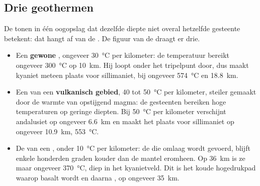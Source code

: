 \subsection{Drie geothermen}

De  tonen in één oogopslag dat dezelfde diepte niet overal hetzelfde
gesteente betekent: dat hangt af van de . De figuur van de 
draagt er drie.

\begin{itemize}
  \item Een \textbf{gewone} , ongeveer \qty{30}{\celsius} per
        kilometer: de temperatuur bereikt ongeveer \qty{300}{\celsius} op
        \qty{10}{km}. Hij loopt onder het tripelpunt door, dus maakt kyaniet
        meteen plaats voor sillimaniet, bij ongeveer \qty{574}{\celsius} en
        \qty{18.8}{km}.
  \item Een  van een \textbf{vulkanisch gebied}, 40 tot \qty{50}{\celsius} per
        kilometer, steiler gemaakt door de warmte van opstijgend magma: de gesteenten bereiken
        hoge temperaturen op geringe diepten. Bij \qty{50}{\celsius} per
        kilometer verschijnt andalusiet op ongeveer \qty{6.6}{km} en maakt het plaats voor
        sillimaniet op ongeveer \qty{10.9}{km}, \qty{553}{\celsius}.
  \item De  van een \textbf{}, onder
        \qty{10}{\celsius} per kilometer: de  die omlaag wordt gevoerd,
        blijft enkele honderden graden kouder dan de mantel eromheen. Op
        \qty{36}{km} is ze maar ongeveer \qty{370}{\celsius}, diep in het
        kyanietveld. Dit is het koude hogedrukpad waarop basalt
         wordt en daarna , op ongeveer \qty{35}{km}.
\end{itemize}

